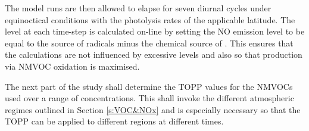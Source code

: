 The model runs are then allowed to elapse for seven diurnal cycles under equinoctical conditions with the photolysis rates of 
the applicable latitude.  The  level at each time-step is calculated on-line by setting the NO emission level to be 
equal to the source of radicals minus the chemical source of . This ensures that the calculations are not influenced by
excessive  levels and also so that  production via NMVOC oxidation is maximised.

The next part of the study shall determine the TOPP values for the NMVOCs used over a range of  concentrations. This 
shall invoke the different atmospheric regimes outlined in Section \ref{s:VOC&NOx} and is especially necessary so that the TOPP 
can be applied to different regions at different times.
